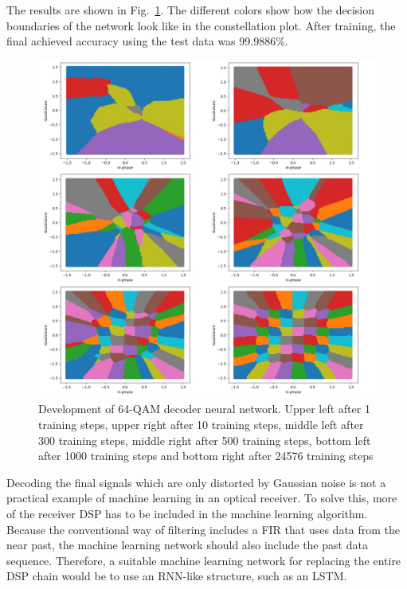 \documentclass[journal,10pt,twoside, a4paper]{IEEEtran}
\begin{document}
The results are shown in Fig.~\ref{fig:linear}. The different colors show how the decision boundaries of the network look like in the constellation plot. After training, the final achieved accuracy using the test data was 99.9886\%.

\begin{figure}
    \centering
    \includegraphics[width=\linewidth]{Thesis/images/linear.jpg}
    \caption{Development of 64-QAM decoder neural network. Upper left after 1 training steps, upper right after 10 training steps, middle left after 300 training steps, middle right after 500 training steps, bottom left after 1000 training steps and bottom right after 24576 training steps}
    \label{fig:linear}
\end{figure}

Decoding the final signals which are only distorted by Gaussian noise is not a practical example of machine learning in an optical receiver. To solve this, more of the receiver DSP has to be included in the machine learning algorithm. Because the conventional way of filtering includes a FIR that uses data from the near past, the machine learning network should also include the past data sequence. Therefore, a suitable machine learning network for replacing the entire DSP chain would be to use an RNN-like structure, such as an LSTM.
\end{document}
